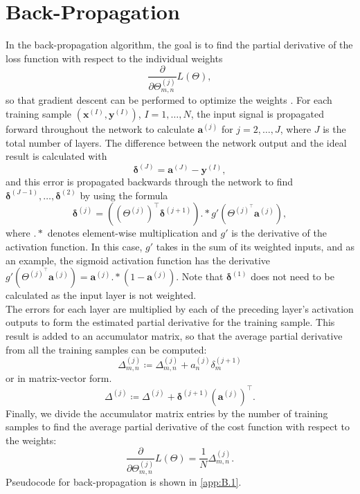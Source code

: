 \documentclass[honours,12pt]{unswthesis}
\numberwithin{equation}{section}
\theoremstyle{definition}
\begin{document}
\section{Back-Propagation}\label{sec:2.7}
In the back-propagation algorithm, the goal is to find the partial derivative of the loss function with respect to the individual weights \[\frac{\partial}{\partial\Theta_{m,n}^{(j)}}L(\Theta),\]
so that gradient descent can be performed to optimize the weights \citep{backprop}. For each training sample $\left(\bm{x}^{(I)},\bm{y}^{(I)}\right)$, $I=1,\dots,N$, the input signal is propagated forward throughout the network to calculate $\bm{a}^{(j)}$ for $j=2,\dots,J$, where $J$ is the total number of layers. The difference between the network output and the ideal result is calculated with 
\[\bm{\delta}^{(J)}=\bm{a}^{(J)}-\bm{y}^{(I)},\] 
and this error is propagated backwards through the network to find $\bm{\delta}^{(J-1)},\dots,\bm{\delta}^{(2)}$ by using the formula 
\[\bm{\delta}^{(j)}=\left(\left(\Theta^{(j)}\right)^\top \bm{\delta}^{(j+1)}\right).*g'\left(\Theta^{(j)^\top} \bm{a}^{(j)}\right),\] 
where $.*$ denotes element-wise multiplication and $g'$ is the derivative of the activation function. In this case, $g'$ takes in the sum of its weighted inputs, and as an example, the sigmoid activation function has the derivative $g'\left(\Theta^{(j)^\top} \bm{a}^{(j)}\right)=\bm{a}^{(j)}.*\left(1-\bm{a}^{(j)}\right)$. Note that $\bm{\delta}^{(1)}$ does not need to be calculated as the input layer is not weighted. \\
The errors for each layer are multiplied by each of the preceding layer's activation outputs to form the estimated partial derivative for the training sample. This result is added to an accumulator matrix, so that the average partial derivative from all the training samples can be computed:
\[\Delta^{(j)}_{m,n}\coloneqq\Delta^{(j)}_{m,n}+a_n^{(j)}\delta_m^{(j+1)}\]
or in matrix-vector form.
\[\Delta^{(j)}\coloneqq\Delta^{(j)}+\bm{\delta}^{(j+1)}\left(\bm{a}^{(j)}\right)^\top.\]
Finally, we divide the accumulator matrix entries by the number of training samples to find the average partial derivative of the cost function with respect to the weights:
\[\frac{\partial}{\partial \Theta^{(j)}_{m,n}}L(\Theta)=\frac1N \Delta_{m,n}^{(j)}.\]
Pseudocode for back-propagation is shown in \autoref{app:B.1}.\\
\end{document}
